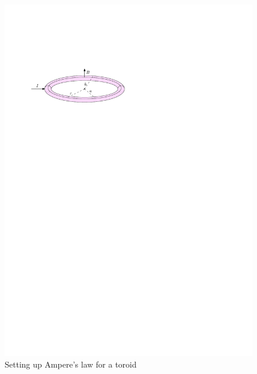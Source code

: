 \documentclass{article}
\begin{document}
\begin{itemize}
\begin{itemize}
\begin{figure}[H]
            \includegraphics{figures/ampere2.pdf}
            \caption{Setting up Ampere's law for a toroid}
          \end{figure}
          \begin{figure}[H]
            \centering

\end{figure}
\end{itemize}
\end{itemize}
\end{document}
